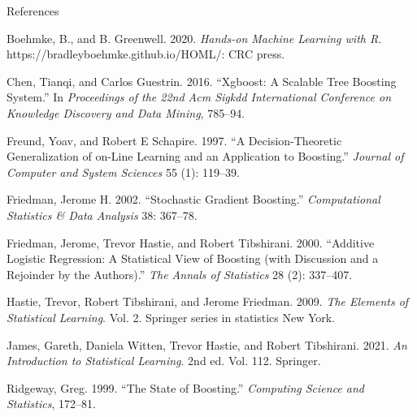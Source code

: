 \documentclass[
  10pt,
  ignorenonframetext,
]{beamer}
\newlength{\cslhangindent}
\newenvironment{CSLReferences}[2] %
 {\begin{list}{}{%
  \setlength{\itemindent}{0pt}
  \setlength{\leftmargin}{0pt}
  \setlength{\parsep}{0pt}
  \ifodd #1
   \setlength{\leftmargin}{\cslhangindent}
   \setlength{\itemindent}{-1\cslhangindent}
  \fi
  \setlength{\itemsep}{#2\baselineskip}}}
 {\end{list}}
\begin{document}
\begin{frame}{References}
\label{references}
\tiny

\label{refs}
\begin{CSLReferences}{1}{0}
Boehmke, B., and B. Greenwell. 2020. \emph{Hands-on Machine Learning
with {R}}. https://bradleyboehmke.github.io/HOML/: CRC press.

Chen, Tianqi, and Carlos Guestrin. 2016. {``Xgboost: A Scalable Tree
Boosting System.''} In \emph{Proceedings of the 22nd Acm Sigkdd
International Conference on Knowledge Discovery and Data Mining},
785--94.

Freund, Yoav, and Robert E Schapire. 1997. {``A Decision-Theoretic
Generalization of on-Line Learning and an Application to Boosting.''}
\emph{Journal of Computer and System Sciences} 55 (1): 119--39.

Friedman, Jerome H. 2002. {``Stochastic Gradient Boosting.''}
\emph{Computational Statistics \& Data Analysis} 38: 367--78.

Friedman, Jerome, Trevor Hastie, and Robert Tibshirani. 2000.
{``Additive Logistic Regression: A Statistical View of Boosting (with
Discussion and a Rejoinder by the Authors).''} \emph{The Annals of
Statistics} 28 (2): 337--407.

Hastie, Trevor, Robert Tibshirani, and Jerome Friedman. 2009. \emph{The
Elements of Statistical Learning}. Vol. 2. Springer series in statistics
New York.

James, Gareth, Daniela Witten, Trevor Hastie, and Robert Tibshirani.
2021. \emph{An Introduction to Statistical Learning}. 2nd ed. Vol. 112.
Springer.

Ridgeway, Greg. 1999. {``The State of Boosting.''} \emph{Computing
Science and Statistics}, 172--81.

\end{CSLReferences}
\end{frame}
\end{document}
